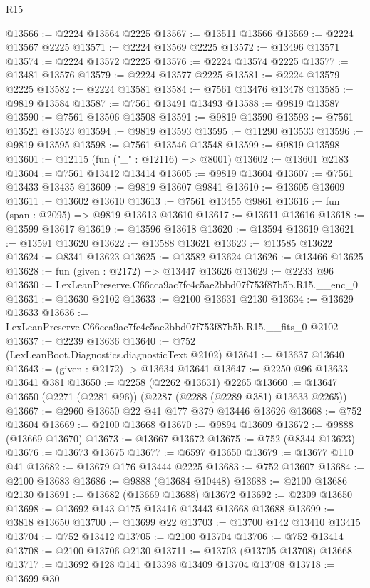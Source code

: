 \begin{lexlean}{R15}
\begin{coremodule}
@13566 := @2224 @13564 @2225
@13567 := @13511 @13566
@13569 := @2224 @13567 @2225
@13571 := @2224 @13569 @2225
@13572 := @13496 @13571
@13574 := @2224 @13572 @2225
@13576 := @2224 @13574 @2225
@13577 := @13481 @13576
@13579 := @2224 @13577 @2225
@13581 := @2224 @13579 @2225
@13582 := @2224 @13581
@13584 := @7561 @13476 @13478
@13585 := @9819 @13584
@13587 := @7561 @13491 @13493
@13588 := @9819 @13587
@13590 := @7561 @13506 @13508
@13591 := @9819 @13590
@13593 := @7561 @13521 @13523
@13594 := @9819 @13593
@13595 := @11290 @13533
@13596 := @9819 @13595
@13598 := @7561 @13546 @13548
@13599 := @9819 @13598
@13601 := @12115 (fun ("_" : @12116) => @8001)
@13602 := @13601 @2183
@13604 := @7561 @13412 @13414
@13605 := @9819 @13604
@13607 := @7561 @13433 @13435
@13609 := @9819 @13607 @9841
@13610 := @13605 @13609
@13611 := @13602 @13610
@13613 := @7561 @13455 @9861
@13616 := fun (span : @2095) => @9819 @13613 @13610
@13617 := @13611 @13616
@13618 := @13599 @13617
@13619 := @13596 @13618
@13620 := @13594 @13619
@13621 := @13591 @13620
@13622 := @13588 @13621
@13623 := @13585 @13622
@13624 := @8341 @13623
@13625 := @13582 @13624
@13626 := @13466 @13625
@13628 := fun (given : @2172) => @13447 @13626
@13629 := @2233 @96
@13630 := LexLeanPreserve.C66cca9ac7fc4c5ae2bbd07f753f87b5b.R15.__enc_0
@13631 := @13630 @2102
@13633 := @2100 @13631 @2130
@13634 := @13629 @13633
@13636 := LexLeanPreserve.C66cca9ac7fc4c5ae2bbd07f753f87b5b.R15.__fits_0 @2102
@13637 := @2239 @13636
@13640 := @752 (LexLeanBoot.Diagnostics.diagnosticText @2102)
@13641 := @13637 @13640
@13643 := (given : @2172) -> @13634 @13641
@13647 := @2250 @96 @13633 @13641 @381
@13650 := @2258 (@2262 @13631) @2265
@13660 := @13647 @13650 (@2271 (@2281 @96)) (@2287 (@2288 (@2289 @381) @13633 @2265))
@13667 := @2960 @13650 @22 @41 @177 @379 @13446 @13626
@13668 := @752 @13604
@13669 := @2100 @13668
@13670 := @9894 @13609
@13672 := @9888 (@13669 @13670)
@13673 := @13667 @13672
@13675 := @752 (@8344 @13623)
@13676 := @13673 @13675
@13677 := @6597 @13650
@13679 := @13677 @110 @41
@13682 := @13679 @176 @13444 @2225
@13683 := @752 @13607
@13684 := @2100 @13683
@13686 := @9888 (@13684 @10448)
@13688 := @2100 @13686 @2130
@13691 := @13682 (@13669 @13688) @13672
@13692 := @2309 @13650
@13698 := @13692 @143 @175 @13416 @13443 @13668 @13688
@13699 := @3818 @13650
@13700 := @13699 @22
@13703 := @13700 @142 @13410 @13415
@13704 := @752 @13412
@13705 := @2100 @13704
@13706 := @752 @13414
@13708 := @2100 @13706 @2130
@13711 := @13703 (@13705 @13708) @13668
@13717 := @13692 @128 @141 @13398 @13409 @13704 @13708
@13718 := @13699 @30

\end{coremodule}
\end{lexlean}
